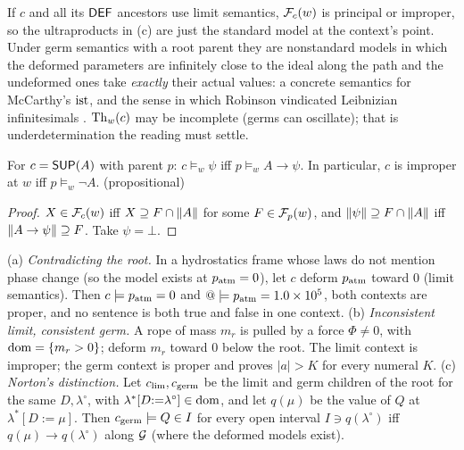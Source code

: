 If $c$ and all its $\mathsf{DEF}$ ancestors use limit semantics, $\mathcal{F}_c(w)$ is principal or
improper, so the ultraproducts in (c) are just the standard model at the context's point.
Under germ semantics with a root parent they are nonstandard models in which the deformed
parameters are infinitely close to the ideal along the path and the undeformed ones take
\emph{exactly} their actual values: a concrete semantics for McCarthy's $\mathrm{ist}$, and the
sense in which Robinson vindicated Leibnizian infinitesimals
\citep{robinson1966nonstandard}. $\mathrm{Th}_w(c)$ may be incomplete (germs can oscillate); that
is underdetermination the reading must settle.

\begin{proposition}\label{prop:physics:sup}
For $c=\mathsf{SUP}(A)$ with parent $p$: $c\models_w\psi$ iff $p\models_w A\to\psi$. In
particular, $c$ is improper at $w$ iff $p\models_w\neg A$.
\hfill{} (propositional)
\end{proposition}
\begin{proof}
$X\in\mathcal{F}_c(w)$ iff $X\supseteq F\cap\lVert A\rVert$ for some $F\in\mathcal{F}_p(w)$, and
$\lVert \psi\rVert\supseteq F\cap\lVert A\rVert$ iff $\lVert A\to\psi\rVert\supseteq F$. Take $\psi=\bot$.
\end{proof}

\begin{proposition}\label{prop:physics:idealized}
\textup{(a)} \emph{Contradicting the root.} In a hydrostatics frame whose laws do not
mention phase change (so the model exists at $p_{\rm atm}=0$), let $c$ deform $p_{\rm atm}$ toward $0$ (limit semantics). Then
$c\models p_{\rm atm}=0$ and $@\models p_{\rm atm}=1.0\times10^5$, both contexts are
proper, and no sentence is both true and false in one context. \textup{(b)}
\emph{Inconsistent limit, consistent germ.} A rope of mass $m_r$ is pulled by a force
$\Phi\neq0$, with $\operatorname{dom}=\{m_r>0\}$; deform $m_r$ toward $0$ below the root. The limit
context is improper; the germ context is proper and proves $|a|>K$ for every numeral $K$.
\textup{(c)} \emph{Norton's distinction.} Let $c_{\lim},c_{\rm germ}$ be the limit and
germ children of the root for the same $D,\lambda^\circ$, with
$\lambda^*[D{:=}\lambda^\circ]\in\operatorname{dom}$, and let $q(\mu)$ be the value of $Q$ at
$\lambda^*[D{:=}\mu]$. Then $c_{\rm germ}\models Q\in I$ for every open interval
$I\ni q(\lambda^\circ)$ iff $q(\mu)\to q(\lambda^\circ)$ along $\mathcal{G}$ (where the deformed
models exist).
\end{proposition}

